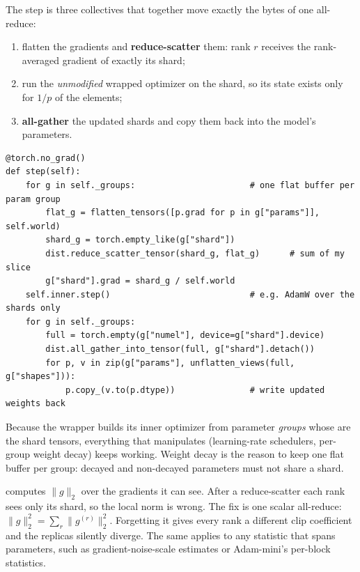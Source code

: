 The step is three collectives that together move exactly the bytes of one all-reduce:

\begin{enumerate}
  \item flatten the gradients and \textbf{reduce-scatter} them: rank $r$ receives the
    rank-averaged gradient of exactly its shard;
  \item run the \emph{unmodified} wrapped optimizer on the shard, so its state exists only for
    $1/p$ of the elements;
  \item \textbf{all-gather} the updated shards and copy them back into the model's parameters.
\end{enumerate}

\begin{lstlisting}[caption={The step of \code{FlatShardedOptimizer} (\code{llmsys/dist/zero\_wrapper.py}).},label={lst:sharding:flatzero}]
@torch.no_grad()
def step(self):
    for g in self._groups:                       # one flat buffer per param group
        flat_g = flatten_tensors([p.grad for p in g["params"]], self.world)
        shard_g = torch.empty_like(g["shard"])
        dist.reduce_scatter_tensor(shard_g, flat_g)      # sum of my slice
        g["shard"].grad = shard_g / self.world
    self.inner.step()                            # e.g. AdamW over the shards only
    for g in self._groups:
        full = torch.empty(g["numel"], device=g["shard"].device)
        dist.all_gather_into_tensor(full, g["shard"].detach())
        for p, v in zip(g["params"], unflatten_views(full, g["shapes"])):
            p.copy_(v.to(p.dtype))               # write updated weights back
\end{lstlisting}

Because the wrapper builds its inner optimizer from parameter \emph{groups} whose
 are the shard tensors, everything that manipulates 
(learning-rate schedulers, per-group weight decay) keeps working. Weight decay is the reason
to keep one flat buffer per group: decayed and non-decayed parameters must not share a shard.

\begin{pitfall}
 computes $\lVert g\rVert_2$ over the gradients it can see. After a
reduce-scatter each rank sees only its shard, so the local norm is wrong. The fix is one scalar
all-reduce: $\lVert g\rVert_2^2 = \sum_r \lVert g^{(r)}\rVert_2^2$. Forgetting it gives every rank a
different clip coefficient and the replicas silently diverge. The same applies to any statistic
that spans parameters, such as gradient-noise-scale estimates or Adam-mini's per-block statistics.
\end{pitfall}

